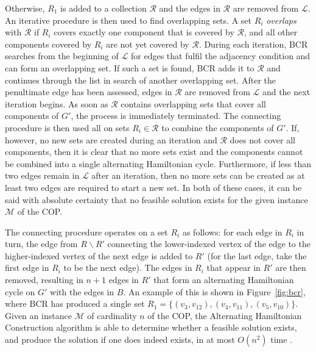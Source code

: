 \documentclass{elsarticle}
\begin{document}
Otherwise, $R_1$ is added to a collection $\mathcal{R}$ and the edges in $\mathcal{R}$ are removed from $\mathcal{L}$. An iterative procedure is then used to find overlapping sets. A set $R_i$ \emph{overlaps} with $\mathcal{R}$ if $R_i$ covers exactly one component that is covered by $\mathcal{R}$, and all other components covered by $R_i$ are not yet covered by $\mathcal{R}$. During each iteration, BCR searches from the beginning of $\mathcal{L}$ for edges that fulfil the adjacency condition and can form an overlapping set. If such a set is found, BCR adds it to $\mathcal{R}$ and continues through the list in search of another overlapping set. After the penultimate edge has been assessed, edges in $\mathcal{R}$ are removed from $\mathcal{L}$ and the next iteration begins. As soon as $\mathcal{R}$ contains overlapping sets that cover all components of $G'$, the process is immediately terminated. The connecting procedure is then used all on sets $R_i \in \mathcal{R}$ to combine the components of $G'$. If, however, no new sets are created during an iteration and $\mathcal{R}$ does not cover all components, then it is clear that no more sets exist and the components cannot be combined into a single alternating Hamiltonian cycle. Furthermore, if less than two edges remain in $\mathcal{L}$ after an iteration, then no more sets can be created as at least two edges are required to start a new set. In both of these cases, it can be said with absolute certainty that no feasible solution exists for the given instance $\mathcal{M}$ of the COP.

The connecting procedure operates on a set $R_i$ as follows: for each edge in $R_i$ in turn, the edge from $R \backslash R'$ connecting the lower-indexed vertex of the edge to the higher-indexed vertex of the next edge is added to $R'$ (for the last edge, take the first edge in $R_i$ to be the next edge). The edges in $R_i$ that appear in $R'$ are then removed, resulting in $n+1$ edges in $R'$ that form an alternating Hamiltonian cycle on $G'$ with the edges in $B$. An example of this is shown in Figure~\ref{fig:bcr}, where BCR has produced a single set $R_1 = \{(v_3, v_{12}),(v_4, v_{11}), (v_5, v_{10})\}$. Given an instance $\mathcal{M}$ of cardinality $n$ of the COP, the Alternating Hamiltonian Construction algorithm is able to determine whether a feasible solution exists, and produce the solution if one does indeed exists, in at most $O(n^2)$ time \cite{hawa2018}.
\end{document}
